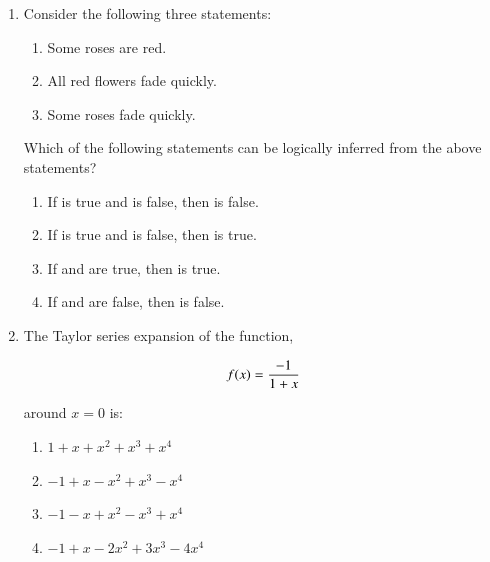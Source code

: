 \documentclass[journal,12pt,onecolumn]{IEEEtran}
\theoremstyle{remark}
\begin{document}
\begin{enumerate}
\begin{center}
\begin{enumerate}
\end{enumerate}
\end{center}

\pagebreak

\item Consider the following three statements:

\begin{enumerate}	
\item Some roses are red.
\item All red flowers fade quickly.
\item Some roses fade quickly.
\end{enumerate}

\noindent
Which of the following statements can be logically inferred from the above statements?

\hfill{}

\begin{enumerate}
\item If  is true and  is false, then  is false.
\item If  is true and  is false, then  is true.
\item If  and  are true, then  is true.
\item If  and  are false, then  is false.
\end{enumerate}

\item The Taylor series expansion of the function,

\hfill{}

\begin{align*}
{\Large f(x) = \frac{-1}{1+x}}
\end{align*}

\noindent
around $x = 0$  is:

\begin{enumerate}
\item $ 1 + x + x^2 + x^3 + x^4$
\item $ -1 + x - x^2 + x^3 - x^4$
\item $ -1 - x + x^2 - x^3 + x^4$
\item $ -1 + x - 2x^2 + 3x^3 - 4x^4$
\end{enumerate}


\end{enumerate}
\end{document}
